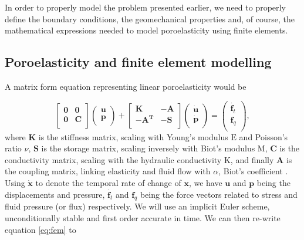 \documentclass{article}
\begin{document}
In order to properly model the problem presented earlier, we need to properly define the boundary conditions, the geomechanical properties and, of course, the mathematical expressions needed to model poroelasticity using finite elements.

\subsection{Poroelasticity and finite element modelling}

A matrix form equation representing linear poroelasticity would be

\begin{equation}
	\begin{bmatrix}
	\mathbf{0} & \mathbf{0} \\
	\mathbf{0} & \mathbf{C} \\
	\end{bmatrix}
	\begin{pmatrix}
	\mathbf{u} \\
	\mathbf{p} \\
	\end{pmatrix}
+
	\begin{bmatrix}
	\mathbf{K} & \mathbf{-A} \\
	\mathbf{-A^T} & \mathbf{-S} \\
	\end{bmatrix}
	\begin{pmatrix}
	\dot{\mathbf{u}} \\
	\dot{\mathbf{p}} \\
	\end{pmatrix}
=
	\begin{pmatrix}
	\dot{\mathbf{f}_t} \\
	{\mathbf{f}_q} \\
	\end{pmatrix},
	\label{eq:fem}
\end{equation}
where $\mathbf{K}$ is the stiffness matrix, scaling with Young's modulus $\mathrm{E}$ and Poisson's ratio $\nu$, $\mathbf{S}$ is the storage matrix, scaling inversely with Biot's modulus $\mathrm{M}$, $\mathbf{C}$ is the conductivity matrix, scaling with the hydraulic conductivity $\mathrm{K}$, and finally $\mathbf{A}$ is the coupling matrix, linking elasticity and fluid flow with $\alpha$, Biot's coefficient \cite{lecampion2022geomechanics}. Using $\dot{\mathbf{x}}$ to denote the temporal rate of change of $\mathbf{x}$, we have $\mathbf{u}$ and $\mathbf{p}$ being the displacements and pressure, $\dot{\mathbf{f}_t}$ and ${\mathbf{f}_q}$ being the force vectors related to stress and fluid pressure (or flux) respectively. We will use an implicit Euler scheme, unconditionally stable and first order accurate in time. We can then re-write equation \ref{eq:fem} to
\end{document}
